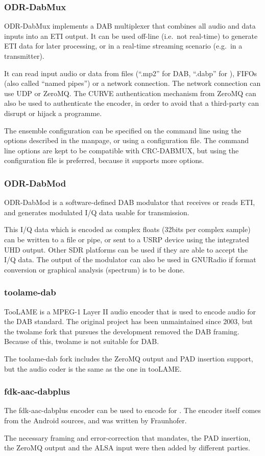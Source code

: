 \subsubsection{ODR-DabMux}
ODR-DabMux implements a DAB multiplexer that combines all audio and data inputs
into an ETI output. It can be used off-line (i.e.~not real-time) to generate ETI
data for later processing, or in a real-time streaming scenario (e.g.~in a
transmitter).

It can read input audio or data from files (``.mp2'' for DAB, ``.dabp'' for
\dabplus), FIFOs (also called ``named pipes'') or a network connection. The
network connection can use UDP or ZeroMQ. The CURVE authentication mechanism
from ZeroMQ can also be used to authenticate the encoder, in order to avoid that
a third-party can disrupt or hijack a programme.

The ensemble configuration can be specified on the command line using the
options described in the manpage, or using a configuration file. The command
line options are kept to be compatible with CRC-DABMUX, but using the
configuration file is preferred, because it supports more options.


\subsubsection{ODR-DabMod}
ODR-DabMod is a software-defined DAB modulator that receives or reads ETI, and
generates modulated I/Q data usable for transmission.

This I/Q data which is encoded as complex floats (32bits per complex sample) can
be written to a file or pipe, or sent to a USRP device using the integrated UHD
output. Other SDR platforms can be used if they are able to accept the I/Q data.
The output of the modulator can also be used in GNURadio if format conversion or
graphical analysis (spectrum) is to be done.

\subsubsection{toolame-dab}
TooLAME is a MPEG-1 Layer II audio encoder that is used to encode audio for the
DAB standard. The original project has been unmaintained since 2003, but the
twolame fork that pursues the development removed the DAB framing. Because of
this, twolame is not suitable for DAB.

The toolame-dab fork includes the ZeroMQ output and PAD insertion support, but
the audio coder is the same as the one in tooLAME.

\subsubsection{fdk-aac-dabplus}
The fdk-aac-dabplus encoder can be used to encode for \dabplus. The encoder
itself comes from the Android sources, and was written by Fraunhofer.

The necessary framing and error-correction that \dabplus mandates, the PAD
insertion, the ZeroMQ output and the ALSA input were then added by different
parties.



